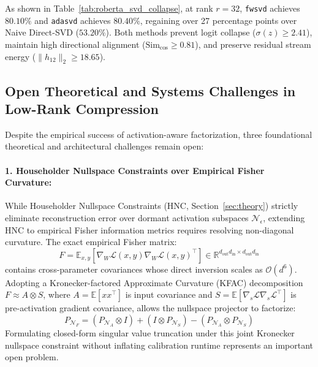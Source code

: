 \documentclass{article}
\begin{document}
As shown in Table~\ref{tab:roberta_svd_collapse}, at rank $r = 32$, \texttt{fwsvd} achieves $80.10\%$ and \texttt{adasvd} achieves $80.40\%$, regaining over 27 percentage points over Naive Direct-SVD ($53.20\%$). Both methods prevent logit collapse ($\sigma(z) \ge 2.41$), maintain high directional alignment ($\text{Sim}_{\cos} \ge 0.81$), and preserve residual stream energy ($\|h_{12}\|_2 \ge 18.65$).

\subsection{Open Theoretical and Systems Challenges in Low-Rank Compression}
Despite the empirical success of activation-aware factorization, three foundational theoretical and architectural challenges remain open:

\paragraph{1. Householder Nullspace Constraints over Empirical Fisher Curvature:}
While Householder Nullspace Constraints (HNC, Section~\ref{sec:theory}) strictly eliminate reconstruction error over dormant activation subspaces $\mathcal{N}_\epsilon$, extending HNC to empirical Fisher information metrics requires resolving non-diagonal curvature. The exact empirical Fisher matrix:
\begin{equation}
    F = \mathbb{E}_{x, y} \left[ \nabla_W \mathcal{L}(x, y) \nabla_W \mathcal{L}(x, y)^\top \right] \in \mathbb{R}^{d_{\text{out}} d_{\text{in}} \times d_{\text{out}} d_{\text{in}}}
\end{equation}
contains cross-parameter covariances whose direct inversion scales as $\mathcal{O}(d^6)$. Adopting a Kronecker-factored Approximate Curvature (KFAC) decomposition $F \approx A \otimes S$, where $A = \mathbb{E}[x x^\top]$ is input covariance and $S = \mathbb{E}[\nabla_s \mathcal{L} \nabla_s \mathcal{L}^\top]$ is pre-activation gradient covariance, allows the nullspace projector to factorize:
\begin{equation}
    P_{\mathcal{N}_F} = (P_{\mathcal{N}_A} \otimes I) + (I \otimes P_{\mathcal{N}_S}) - (P_{\mathcal{N}_A} \otimes P_{\mathcal{N}_S})
\end{equation}
Formulating closed-form singular value truncation under this joint Kronecker nullspace constraint without inflating calibration runtime represents an important open problem.
\end{document}
